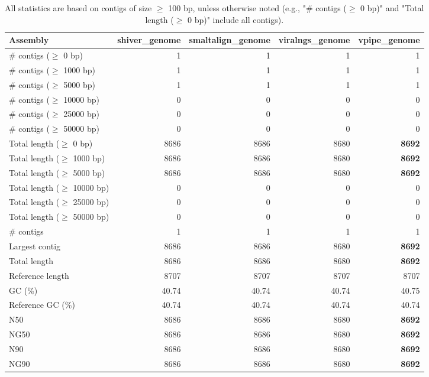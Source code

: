 \documentclass[12pt,a4paper]{article}
\begin{document}
\begin{table}[ht]
\begin{center}
\caption{All statistics are based on contigs of size $\geq$ 100 bp, unless otherwise noted (e.g., "\# contigs ($\geq$ 0 bp)" and "Total length ($\geq$ 0 bp)" include all contigs).}
\begin{tabular}{|l*{4}{|r}|}
\hline
Assembly & shiver\_genome & smaltalign\_genome & viralngs\_genome & vpipe\_genome \\ \hline
\# contigs ($\geq$ 0 bp) & 1 & 1 & 1 & 1 \\ \hline
\# contigs ($\geq$ 1000 bp) & 1 & 1 & 1 & 1 \\ \hline
\# contigs ($\geq$ 5000 bp) & 1 & 1 & 1 & 1 \\ \hline
\# contigs ($\geq$ 10000 bp) & 0 & 0 & 0 & 0 \\ \hline
\# contigs ($\geq$ 25000 bp) & 0 & 0 & 0 & 0 \\ \hline
\# contigs ($\geq$ 50000 bp) & 0 & 0 & 0 & 0 \\ \hline
Total length ($\geq$ 0 bp) & 8686 & 8686 & 8680 & {\bf 8692} \\ \hline
Total length ($\geq$ 1000 bp) & 8686 & 8686 & 8680 & {\bf 8692} \\ \hline
Total length ($\geq$ 5000 bp) & 8686 & 8686 & 8680 & {\bf 8692} \\ \hline
Total length ($\geq$ 10000 bp) & 0 & 0 & 0 & 0 \\ \hline
Total length ($\geq$ 25000 bp) & 0 & 0 & 0 & 0 \\ \hline
Total length ($\geq$ 50000 bp) & 0 & 0 & 0 & 0 \\ \hline
\# contigs & 1 & 1 & 1 & 1 \\ \hline
Largest contig & 8686 & 8686 & 8680 & {\bf 8692} \\ \hline
Total length & 8686 & 8686 & 8680 & {\bf 8692} \\ \hline
Reference length & 8707 & 8707 & 8707 & 8707 \\ \hline
GC (\%) & 40.74 & 40.74 & 40.74 & 40.75 \\ \hline
Reference GC (\%) & 40.74 & 40.74 & 40.74 & 40.74 \\ \hline
N50 & 8686 & 8686 & 8680 & {\bf 8692} \\ \hline
NG50 & 8686 & 8686 & 8680 & {\bf 8692} \\ \hline
N90 & 8686 & 8686 & 8680 & {\bf 8692} \\ \hline
NG90 & 8686 & 8686 & 8680 & {\bf 8692} \\ \hline

\end{tabular}
\end{center}
\end{table}
\end{document}
